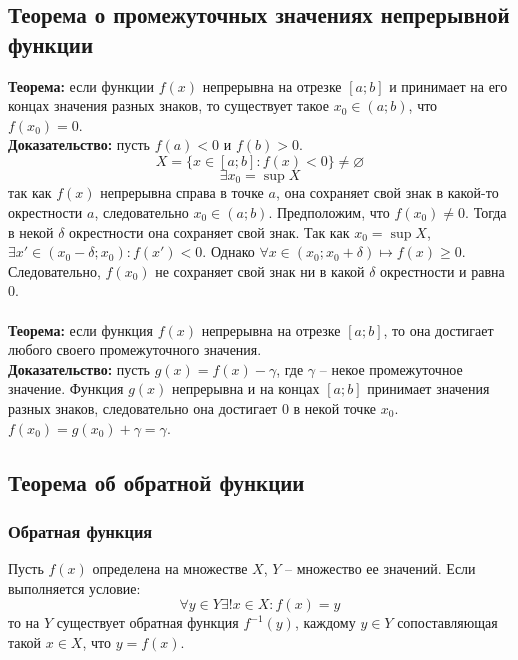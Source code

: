 \documentclass{article}
\newcommand{\theorem}{\textbf{Теорема:} }
\newcommand{\proof}{\textbf{Доказательство:} }
\newcommand{\otr}[2]{$[#1;#2]$}
\begin{document}
    \subsection*{Теорема о промежуточных значениях непрерывной функции}
        \theorem если функции $f(x)$ непрерывна на отрезке \otr{a}{b} и принимает на его концах значения разных знаков, то существует такое $x_0 \in (a;b)$, что $f(x_0) = 0$.
        \\
        \proof пусть $f(a) < 0$ и $f(b) > 0$.
        \[ X = \{x \in [a;b]: f(x) < 0\} \neq \varnothing \]
        \[ \exists x_0 = \sup X \]
        так как $f(x)$ непрерывна справа в точке $a$, она сохраняет свой знак в какой-то окрестности $a$, следовательно $x_0 \in (a;b)$.
        Предположим, что $f(x_0) \neq 0$. Тогда в некой $\delta$ окрестности она сохраняет свой знак. Так как $x_0 = \sup X$,
        $\exists x' \in (x_0 - \delta; x_0): f(x') < 0$. Однако $\forall x \in (x_0; x_0 + \delta) \longmapsto f(x) \ge 0$. Следовательно, $f(x_0)$ не сохраняет свой знак
        ни в какой $\delta$ окрестности и равна $0$.
        \\
        \\
        \theorem если функция $f(x)$ непрерывна на отрезке \otr{a}{b}, то она достигает любого своего промежуточного значения.
        \\
        \proof пусть $g(x) = f(x) - \gamma$, где $\gamma$ -- некое промежуточное значение. Функция $g(x)$ непрерывна и на концах \otr{a}{b} принимает значения разных знаков,
        следовательно она достигает $0$ в некой точке $x_0$. $f(x_0) = g(x_0) + \gamma = \gamma$.
        
    \subsection*{Теорема об обратной функции}
        \subsubsection*{Обратная функция}
        Пусть $f(x)$ определена на множестве $X$, $Y$ -- множество ее значений. Если выполняется условие:
        \[ \forall y \in Y \exists! x \in X: f(x) = y \]
        то на $Y$ существует обратная функция $f^{-1}(y)$, каждому $y \in Y$ сопоставляющая такой $x \in X$, что $y = f(x)$.
        
\end{document}
